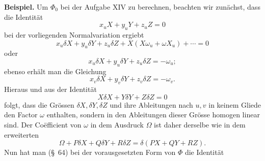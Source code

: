 \documentclass[11pt,a4paper,leqno]{article}
\begin{document}
\textbf{Beispiel.} Um $\Phi_0$ bei der Aufgabe XIV zu berechnen, beachten
wir zunächst, dass die Identität
\[
x_uX+y_uY+z_uZ=0
\]
bei der vorliegenden Normalvariation ergiebt
\[
x_u\delta X+y_u\delta Y+z_u\delta Z
+X(X\omega_u+\omega X_u)+\cdots=0
\]
oder
\[
x_u\delta X+y_u\delta Y+z_u\delta Z=-\omega_u;
\]
ebenso erhält man die Gleichung
\[
x_v\delta X+y_v\delta Y+z_v\delta Z=-\omega_v.
\]
Hieraus und aus der Identität
\[
X\delta X+Y\delta Y+Z\delta Z=0
\]
folgt, dass die Grössen $\delta X,\delta Y,\delta Z$ und ihre Ableitungen
nach $u,v$ in keinem Gliede den Factor $\omega$ enthalten, sondern in den
Ableitungen dieser Grösse homogen linear sind. Der Coëfficient von $\omega$
in dem Ausdruck $\Omega$ ist daher derselbe wie in dem erweiterten
\begin{equation}\tag{30}
\Omega+P\delta X+Q\delta Y+R\delta Z=\delta(PX+QY+RZ).
\end{equation}
Nun hat man (\S~64) bei der vorausgesetzten Form von $\Phi$ die Identität
\end{document}
